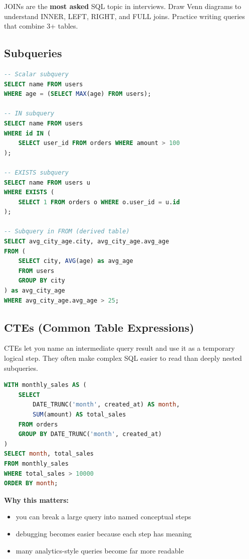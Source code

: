 \documentclass[12pt, a4paper, oneside]{book}
\begin{document}
\begin{interviewbox}
JOINs are the \textbf{most asked} SQL topic in interviews. Draw Venn diagrams to understand INNER, LEFT, RIGHT, and FULL joins. Practice writing queries that combine 3+ tables.
\end{interviewbox}

\subsection{Subqueries}

\begin{lstlisting}[language=SQL, caption={Subqueries}]
-- Scalar subquery
SELECT name FROM users
WHERE age = (SELECT MAX(age) FROM users);

-- IN subquery
SELECT name FROM users
WHERE id IN (
    SELECT user_id FROM orders WHERE amount > 100
);

-- EXISTS subquery
SELECT name FROM users u
WHERE EXISTS (
    SELECT 1 FROM orders o WHERE o.user_id = u.id
);

-- Subquery in FROM (derived table)
SELECT avg_city_age.city, avg_city_age.avg_age
FROM (
    SELECT city, AVG(age) as avg_age
    FROM users
    GROUP BY city
) as avg_city_age
WHERE avg_city_age.avg_age > 25;
\end{lstlisting}

\subsection{CTEs (Common Table Expressions)}

CTEs let you name an intermediate query result and use it as a temporary logical step. They often make complex SQL easier to read than deeply nested subqueries.

\begin{lstlisting}[language=SQL, caption={CTE example}]
WITH monthly_sales AS (
    SELECT
        DATE_TRUNC('month', created_at) AS month,
        SUM(amount) AS total_sales
    FROM orders
    GROUP BY DATE_TRUNC('month', created_at)
)
SELECT month, total_sales
FROM monthly_sales
WHERE total_sales > 10000
ORDER BY month;
\end{lstlisting}

\textbf{Why this matters:}
\begin{itemize}[leftmargin=2em]
    \item you can break a large query into named conceptual steps
    \item debugging becomes easier because each step has meaning
    \item many analytics-style queries become far more readable
\end{itemize}
\end{document}
